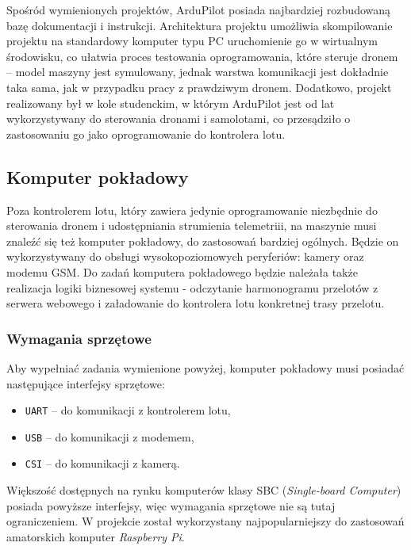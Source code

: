Spośród wymienionych projektów, ArduPilot posiada najbardziej rozbudowaną bazę 
dokumentacji i instrukcji. Architektura projektu umożliwia skompilowanie projektu
na standardowy komputer typu PC uruchomienie go w wirtualnym
środowisku\cite{ardupilot_sitl}, co ułatwia proces testowania oprogramowania,
które steruje dronem -- model maszyny jest symulowany, jednak warstwa komunikacji
jest dokładnie taka sama, jak w przypadku pracy z prawdziwym dronem. Dodatkowo, projekt
realizowany był w kole studenckim, w którym ArduPilot jest od lat wykorzystywany
do sterowania dronami i samolotami, co przesądziło o zastosowaniu go jako
oprogramowanie do kontrolera lotu.

\subsection{Komputer pokładowy}

Poza kontrolerem lotu, który zawiera jedynie oprogramowanie 
niezbędnie do sterowania dronem i udostępniania
strumienia telemetriii, na maszynie musi znaleźć się też komputer pokładowy, 
do zastosowań bardziej ogólnych. Będzie on wykorzystywany do
obsługi wysokopoziomowych peryferiów: kamery oraz modemu GSM. Do zadań
komputera pokładowego będzie należała także realizacja logiki biznesowej systemu
- odczytanie harmonogramu przelotów z serwera webowego i załadowanie do kontrolera lotu
konkretnej trasy przelotu.

\subsubsection{Wymagania sprzętowe}

Aby wypełniać zadania wymienione powyżej, komputer pokładowy musi
posiadać następujące interfejsy sprzętowe:

\begin{itemize}
	\item \texttt{UART} -- do komunikacji z kontrolerem lotu,
	\item \texttt{USB} -- do komunikacji z modemem,
	\item \texttt{CSI} -- do komunikacji z kamerą.
\end{itemize}

Większość dostępnych na rynku komputerów klasy SBC (\textit{Single-board Computer})
posiada powyższe interfejsy, więc wymagania sprzętowe nie są tutaj ograniczeniem.
W projekcie został wykorzystany najpopularniejszy do zastosowań amatorskich
komputer \textit{Raspberry Pi}. 


